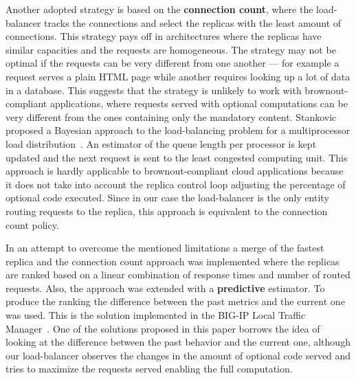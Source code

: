 Another adopted strategy is based on the \textbf{connection count},
where the load-balancer tracks the connections and select the replicas
with the least amount of connections. This strategy pays off in
architectures where the replicas have similar capacities and the
requests are homogeneous. The strategy may not be optimal if the
requests can be very different from one another --- for example a
request serves a plain HTML page while another requires looking up a
lot of data in a database. This suggests that the strategy is unlikely
to work with brownout-compliant applications, where requests served
with optional computations can be very different from the ones
containing only the mandatory content. Stankovic proposed a Bayesian
approach to the load-balancing problem for a multiprocessor load
distribution~\cite{Stankovic:TC}. An estimator of the queue length per
processor is kept updated and the next request is sent to the least
congested computing unit. This approach is hardly applicable to
brownout-compliant cloud applications because it does not take into
account the replica control loop adjusting the percentage of optional
code executed. Since in our case the load-balancer is the only entity
routing requests to the replica, this approach is equivalent to the
connection count policy.

In an attempt to overcome the mentioned limitations a merge of the
fastest replica and the connection count approach was implemented
where the replicas are ranked based on a linear combination of
response times and number of routed requests. Also, the approach was
extended with a \textbf{predictive} estimator. To produce the ranking
the difference between the past metrics and the current one was
used. This is the solution implemented in the BIG-IP Local Traffic
Manager~\cite{BIGIP}. One of the solutions proposed in this paper
borrows the idea of looking at the difference between the past
behavior and the current one, although our load-balancer observes the
changes in the amount of optional code served and tries to maximize
the requests served enabling the full computation.

